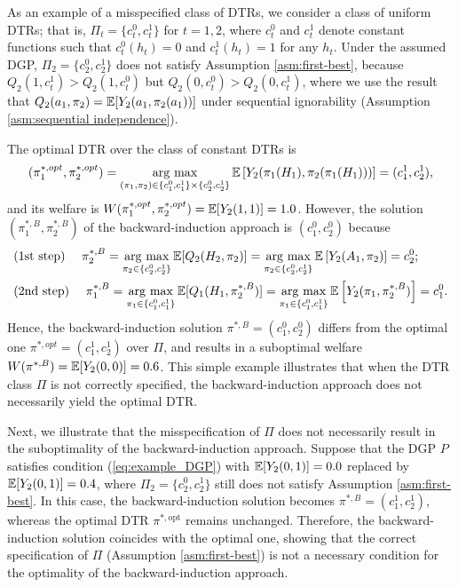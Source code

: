 As an example of a misspecified class of DTRs, we consider a class of uniform DTRs; that is, $\Pi_t = \{c_{t}^{0},c_{t}^{1}\}$ for $t=1,2$, where $c_{t}^{0}$ and $c_{t}^{1}$ denote constant functions such that $c_{t}^{0}(h_t)=0$ and $c_{t}^{1}(h_t)=1$ for any $h_t$.
Under the assumed DGP, $\Pi_2 = \{c_{2}^{0},c_{2}^{1}\}$ does not satisfy Assumption \ref{asm:first-best}, because $Q_2(1,c_{t}^{1}) > Q_2(1,c_{t}^{0})$ but $Q_2(0,c_{t}^{0}) > Q_2(0,c_{t}^{1})$, where we use the result that $Q_2(a_1,\pi_{2}) = \mathbb{E}[Y_{2}(a_1,\pi_2(a_1))]$ under sequential ignorability (Assumption \ref{asm:sequential independence}).

The optimal DTR over the class of constant DTRs is
\begin{align*}
    (\pi_{1}^{\ast,opt},\pi_{2}^{\ast,opt}) = \mathop{\rm arg~max}\limits_{(\pi_1,\pi_2) \in \{c_{1}^{0},c_{1}^{1}\} \times \{c_{2}^{0},c_{2}^{1}\}} \mathbb{E}\left[Y_2(\pi_1(H_1),\pi_2(\pi_1(H_1)))\right] = (c_{1}^{1},c_{2}^{1}),
\end{align*}
and its welfare is $W(\pi_{1}^{\ast,opt},\pi_{2}^{\ast,opt})=\mathbb{E}[Y_2(1,1)]=1.0$.
However, the solution $(\pi_{1}^{\ast,B},\pi_{2}^{\ast,B})$ of the backward-induction approach is $(c_{1}^{0},c_{2}^{0})$ because
\begin{align*}
    &\mbox{(1st step)\ \ \ \ }\pi_{2}^{\ast,B} = \mathop{\rm arg~max}\limits_{\pi_2 \in \{c_{2}^{0},c_{2}^{1}\}}\mathbb{E}[Q_2(H_2,\pi_2)] = \mathop{\rm arg~max}\limits_{\pi_2 \in \{c_{2}^{0},c_{2}^{1}\}}\mathbb{E}\left[Y_2(A_1,\pi_2)\right] = c_{2}^{0};  \nonumber \\
    &\mbox{(2nd step)\ \ \ \ }\pi_{1}^{\ast,B} = \mathop{\rm arg~max}\limits_{\pi_1 \in \{c_{1}^{0},c_{1}^{1}\}}\mathbb{E}[Q_1(H_1,\pi_{2}^{\ast,B})] = \mathop{\rm arg~max}\limits_{\pi_1 \in \{c_{1}^{0},c_{1}^{1}\}}\mathbb{E}\left[Y_2(\pi_1,\pi_{2}^{\ast,B})\right]  = c_{1}^{0}.  
\end{align*}
Hence, the backward-induction solution $\pi^{\ast,B}=(c_{1}^{0},c_{2}^{0})$ differs from the optimal one $\pi^{\ast,opt}=(c_{1}^{1},c_{2}^{1})$ over $\Pi$, and results in a suboptimal welfare $W(\pi^{\ast,B})=\mathbb{E}[Y_2(0,0)]=0.6$.
This simple example illustrates that when the DTR class $\Pi$ is not correctly specified, the backward-induction approach does not necessarily yield the optimal DTR.
\par 
Next, we illustrate that the misspecification of $\Pi$ does not necessarily result in the suboptimality of the backward-induction approach. Suppose that the DGP $P$ satisfies condition (\ref{eq:example_DGP}) with $\mathbb{E}[Y_2(0,1)] = 0.0$ replaced by $\mathbb{E}[Y_2(0,1)] = 0.4$, where $\Pi_2 = \{c_{2}^{0},c_{2}^{1}\}$ still does not satisfy Assumption \ref{asm:first-best}. In this case, the backward-induction solution becomes $\pi^{\ast,B} = (c_{1}^{1}, c_{2}^{1})$, whereas the optimal DTR $\pi^{\ast,\text{opt}}$ remains unchanged. Therefore, the backward-induction solution coincides with the optimal one, showing that the correct specification of $\Pi$ (Assumption \ref{asm:first-best}) is not a necessary condition for the optimality of the backward-induction approach.


